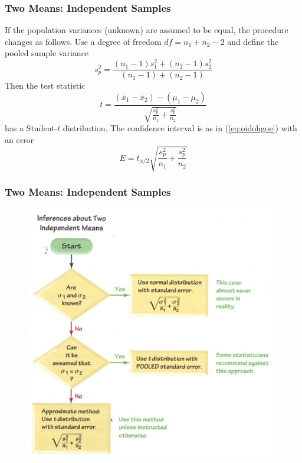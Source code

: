 \documentclass[xcolor=dvipsnames]{beamer}
\begin{document}
\begin{frame}
  \frametitle{Two Means: Independent Samples}
  If the population variances (unknown) are assumed to be equal, the procedure changes as follows. Use a degree of freedom $df=n_{1}+n_{2}-2$ and define the pooled sample variance
  \begin{equation}
    \label{eq:noocheij}
    s_{p}^{2}=\frac{(n_{1}-1)s_{1}^{2}+(n_{2}-1)s_{2}^{2}}{(n_{1}-1)+(n_{2}-1)}
  \end{equation}
Then the test statistic
\begin{equation}
  \label{eq:thiawook}
    t=\frac{(\bar{x}_{1}-\bar{x}_{2})-(\mu_{1}-\mu_{2})}{\sqrt{\frac{s_{p}^{2}}{n_{1}}+\frac{s_{p}^{2}}{n_{2}}}}
\end{equation}
has a Student-$t$ distribution. The confidence interval is as in (\ref{eq:oidohgoe}) with an error
\begin{equation}
  \label{eq:ainahmai}
  E=t_{\alpha/2}\sqrt{\frac{s_{p}^{2}}{n_{1}}+\frac{s_{p}^{2}}{n_{2}}}
\end{equation}
\end{frame}

\begin{frame}
  \frametitle{Two Means: Independent Samples}
  \begin{figure}[h]
    \includegraphics[scale=0.55]{./diagrams/triola-455.png}
  \end{figure}
\end{frame}
\end{document}
